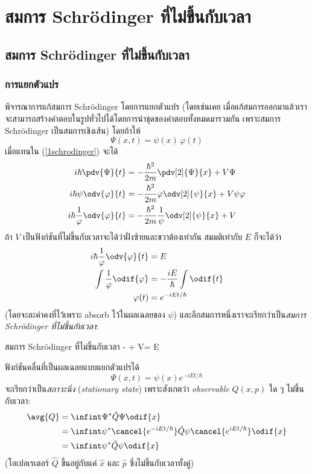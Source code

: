 \chapter{สมการ Schrödinger ที่ไม่ขึ้นกับเวลา}

\section{สมการ Schrödinger ที่ไม่ขึ้นกับเวลา}

\subsection{การแยกตัวแปร}

พิจารณาการแก้สมการ Schrödinger โดยการแยกตัวแปร (โดยเช่นเคย เมื่อแก้สมการออกมาแล้วเราจะสามารถสร้างคำตอบในรูปทั่วไปได้โดยการนำชุดของคำตอบทั้งหมดมารวมกัน เพราะสมการ Schrödinger เป็นสมการเชิงเส้น) โดยถ้าให้
\[
\Psi(x, t) = \psi(x)\,\varphi(t)
\]
เมื่อแทนใน (\ref{1schrodinger}) จะได้
\begin{align*}
    i\hbar\pdv{\Psi}{t} &= -\frac{\hbar^2}{2m} \pdv[2]{\Psi}{x} + V\Psi\\
    i\hbar\psi\odv{\varphi}{t} &= -\frac{\hbar^2}{2m}\varphi\odv[2]{\psi}{x} + V\psi\varphi\\
    i\hbar\frac{1}{\varphi}\odv{\varphi}{t} &= -\frac{\hbar^2}{2m}\frac{1}{\psi}\odv[2]{\psi}{x} + V
\end{align*}
ถ้า $V$ เป็นฟังก์ชันที่ไม่ขึ้นกับเวลาจะได้ว่าฝั่งซ้ายและขวาต้องเท่ากัน สมมติเท่ากับ $E$ ก็จะได้ว่า
\begin{align}
    i\hbar\frac{1}{\varphi}\odv{\varphi}{t} &= E\notag\\
    \int\frac{1}{\varphi}\odif{\varphi} &= -\frac{iE}{\hbar}\int\odif{t}\notag\\
    \varphi(t) &= e^{-iEt/\hbar}
\end{align}
(โดยจะละค่าคงที่ไว้เพราะ absorb ไว้ในผลเฉลยของ $\psi$) และอีกสมการหนึ่งเราจะเรียกว่าเป็น\emph{สมการ Schrödinger ที่ไม่ขึ้นกับเวลา}: 
\begin{ieqbox}{สมการ Schrödinger ที่ไม่ขึ้นกับเวลา}
    - + V\psi = E\psi\label{2timeindepschrodinger}
\end{ieqbox}

ฟังก์ชันคลื่นที่เป็นผลเฉลยแบบแยกตัวแปรได้
\begin{equation}
    \Psi(x, t) = \psi(x) e^{-iEt/\hbar}
\end{equation}
จะเรียกว่าเป็น\emph{สภาวะนิ่ง} (\emph{stationary state}) เพราะสังเกตว่า \emph{observable} $Q(x, p)$ ใด ๆ ไม่ขึ้นกับเวลา:
\begin{align*}
    \avg{Q} &= \infint \Psi^*\hat{Q}\Psi \odif{x}\\
    &= \infint \psi^*\cancel{e^{-iEt/\hbar}}\hat{Q}\psi \cancel{e^{iEt/\hbar}} \odif{x}\\
    &= \infint \psi^*\hat{Q}\psi \odif{x}
\end{align*}
(โอเปอเรเตอร์ $\hat{Q}$ ขึ้นอยู่กับแค่ $\hat{x}$ และ $\hat{p}$ ซึ่งไม่ขึ้นกับเวลาทั้งคู่)

